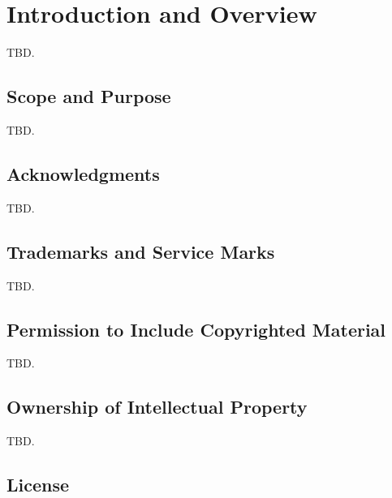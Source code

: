 \section{Introduction and Overview}
\label{siov0}

TBD.


\subsection{Scope and Purpose}
\label{siov0:sspu0}

TBD.


\subsection{Acknowledgments}
\label{siov0:sack0}

TBD.


\subsection{Trademarks and Service Marks}
\label{siov0:stsm0}

TBD.


\subsection{Permission to Include Copyrighted Material}
\label{siov0:spcr0}

TBD.


\subsection{Ownership of Intellectual Property}
\label{siov0:sipr0}

TBD.


\subsection{License}
\label{siov0:slic0}

